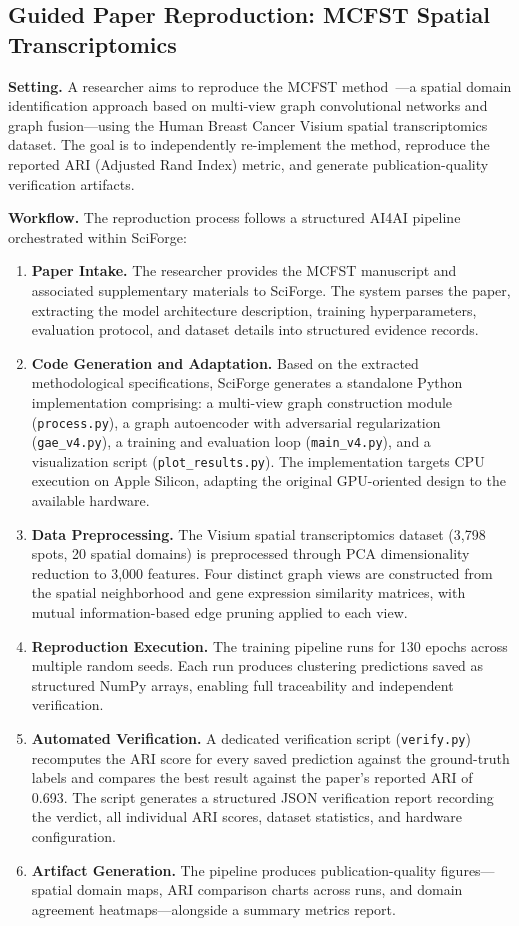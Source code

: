 \documentclass[sn-basic,Numbered,pdflatex]{sn-jnl}
\begin{document}
\subsection{Guided Paper Reproduction: MCFST Spatial Transcriptomics}

\textbf{Setting.} A researcher aims to reproduce the MCFST method~\cite{MCFST2025}---a spatial domain identification approach based on multi-view graph convolutional networks and graph fusion---using the Human Breast Cancer Visium spatial transcriptomics dataset. The goal is to independently re-implement the method, reproduce the reported ARI (Adjusted Rand Index) metric, and generate publication-quality verification artifacts.

\textbf{Workflow.} The reproduction process follows a structured AI4AI pipeline orchestrated within SciForge:
\begin{enumerate}[leftmargin=*]
    \item \textbf{Paper Intake.} The researcher provides the MCFST manuscript and associated supplementary materials to SciForge. The system parses the paper, extracting the model architecture description, training hyperparameters, evaluation protocol, and dataset details into structured evidence records.
    \item \textbf{Code Generation and Adaptation.} Based on the extracted methodological specifications, SciForge generates a standalone Python implementation comprising: a multi-view graph construction module (\texttt{process.py}), a graph autoencoder with adversarial regularization (\texttt{gae\_v4.py}), a training and evaluation loop (\texttt{main\_v4.py}), and a visualization script (\texttt{plot\_results.py}). The implementation targets CPU execution on Apple Silicon, adapting the original GPU-oriented design to the available hardware.
    \item \textbf{Data Preprocessing.} The Visium spatial transcriptomics dataset (3,798 spots, 20 spatial domains) is preprocessed through PCA dimensionality reduction to 3,000 features. Four distinct graph views are constructed from the spatial neighborhood and gene expression similarity matrices, with mutual information-based edge pruning applied to each view.
    \item \textbf{Reproduction Execution.} The training pipeline runs for 130 epochs across multiple random seeds. Each run produces clustering predictions saved as structured NumPy arrays, enabling full traceability and independent verification.
    \item \textbf{Automated Verification.} A dedicated verification script (\texttt{verify.py}) recomputes the ARI score for every saved prediction against the ground-truth labels and compares the best result against the paper's reported ARI of 0.693. The script generates a structured JSON verification report recording the verdict, all individual ARI scores, dataset statistics, and hardware configuration.
    \item \textbf{Artifact Generation.} The pipeline produces publication-quality figures---spatial domain maps, ARI comparison charts across runs, and domain agreement heatmaps---alongside a summary metrics report.
\end{enumerate}
\end{document}

